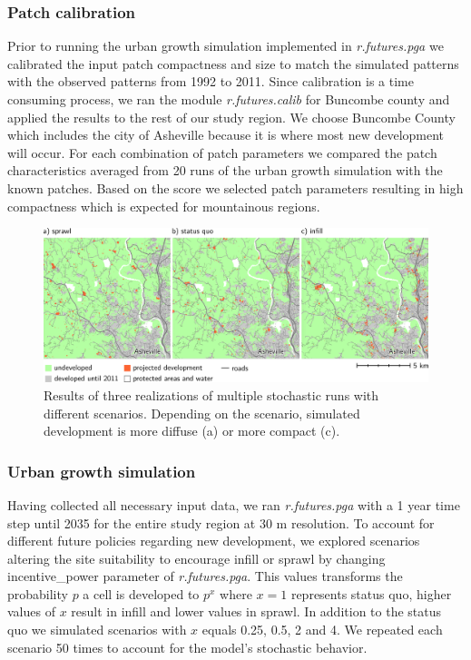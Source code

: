 \documentclass{isprs}
\begin{document}
\subsubsection{Patch calibration}
Prior to running the urban growth simulation implemented in \emph{r.futures.pga}
we calibrated the input patch compactness and size to match
the simulated patterns with the observed patterns from 1992 to 2011.
Since calibration is a time consuming process, we ran the module
\emph{r.futures.calib} for Buncombe county 
and applied the results to the rest of our study region.
We choose Buncombe County which includes the city of Asheville  because it is where most new development will occur.
For each combination of patch parameters we compared the patch characteristics 
averaged from 20 runs of the urban growth simulation with the known patches.
Based on the score we selected patch parameters resulting in high compactness
which is expected for mountainous regions.

\begin{figure}[!h]
 \centering
 \includegraphics[width=2.0\columnwidth]{./figures/results_maps.pdf}
 \caption{Results of three realizations of multiple stochastic runs with different scenarios.
 Depending on the scenario, simulated development is more diffuse (a) or more compact (c).}
 \label{fig:results}
\end{figure}

\subsubsection{Urban growth simulation}
Having collected all necessary input data, we ran 
\emph{r.futures.pga} with a 1 year time step until 2035 for the entire study region at 30 m resolution.
To account for different future policies regarding new development, we explored
scenarios altering the site suitability to encourage infill or sprawl by changing
incentive\_power parameter of \emph{r.futures.pga}. This values transforms
the probability $p$ a cell is developed to $p^x$ where $x = 1$ represents status quo,
higher values of $x$ result in infill and lower values in sprawl.
In addition to the status quo we simulated scenarios with $x$ equals 0.25, 0.5, 2 and 4.
We repeated each scenario 50 times to account for the model's stochastic behavior.
\end{document}
